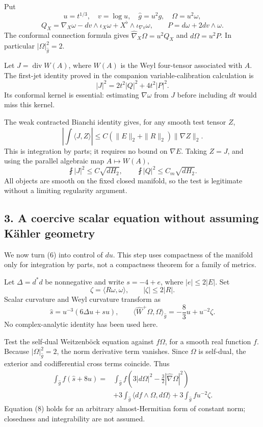 \documentclass[
  11pt,
]{article}
\begin{document}
Put \[
 u=t^{1/3},\quad v=\log u,\quad
 \widehat g=u^2g,\quad \Omega=u^2\omega,
\] \[
 Q_X=\nabla_X\omega-dv\wedge\iota_X\omega
                     +X^\flat\wedge\iota_{\nabla v}\omega,
 \qquad P=d\omega+2dv\wedge\omega.
\tag{3}
\] The conformal connection formula gives
\(\widehat\nabla_X\Omega=u^2Q_X\) and \(d\Omega=u^2P\). In particular
\(|\Omega|_{\widehat g}^2=2\).

Let \(J=\operatorname{div}W(A)\), where \(W(A)\) is the Weyl four-tensor
associated with \(A\). The first-jet identity proved in the companion
variable-calibration calculation is \[
 |J|^2=2t^2|Q|^2+4t^2|P|^2.
\tag{4}
\] Its conformal kernel is essential: estimating \(\nabla\omega\) from
\(J\) before including \(dt\) would miss this kernel.

The weak contracted Bianchi identity gives, for any smooth test tensor
\(Z\), \[
 \left|\int\langle J,Z\rangle\right|
 \le C(\|E\|_2+\|R\|_2)\|\nabla Z\|_2.
\tag{5}
\] This is integration by parts; it requires no bound on \(\nabla E\).
Taking \(Z=J\), and using the parallel algebraic map \(A\mapsto W(A)\),
\[
 \fint|J|^2\le C\sqrt{dH_2},\qquad
 \fint|Q|^2\le C_m\sqrt{dH_2}.
\tag{6}
\] All objects are smooth on the fixed closed manifold, so the test is
legitimate without a limiting regularity argument.

\hypertarget{a-coercive-scalar-equation-without-assuming-kuxe4hler-geometry}{%
\subsection{3. A coercive scalar equation without assuming Kähler
geometry}\label{a-coercive-scalar-equation-without-assuming-kuxe4hler-geometry}}

We now turn (6) into control of \(du\). This step uses compactness of
the manifold only for integration by parts, not a compactness theorem
for a family of metrics.

Let \(\Delta=d^*d\) be nonnegative and write \(s=-4+e\), where
\(|e|\le2|E|\). Set \[
 \zeta=\langle R\omega,\omega\rangle,\qquad |\zeta|\le2|R|.
\] Scalar curvature and Weyl curvature transform as \[
 \widehat s=u^{-3}(6\Delta u+su),\qquad
 \langle\widehat W^+\Omega,\Omega\rangle_{\widehat g}
       =-\frac83u+u^{-2}\zeta.
\tag{7}
\] No complex-analytic identity has been used here.

Test the self-dual Weitzenböck equation against \(f\Omega\), for a
smooth real function \(f\). Because \(|\Omega|^2_{\widehat g}=2\), the
norm derivative term vanishes. Since \(\Omega\) is self-dual, the
exterior and codifferential cross terms coincide. Thus \[
\begin{split}
 \int_{\widehat g} f(\widehat s+8u)
  ={}&\int_{\widehat g} f
       \left(3|d\Omega|^2-\tfrac32|\widehat\nabla\Omega|^2\right)\\
    &+3\int_{\widehat g}\langle df\wedge\Omega,d\Omega\rangle
      +3\int_{\widehat g}fu^{-2}\zeta.
\end{split}                                                   \tag{8}
\] Equation (8) holds for an arbitrary almost-Hermitian form of constant
norm; closedness and integrability are not assumed.
\end{document}
